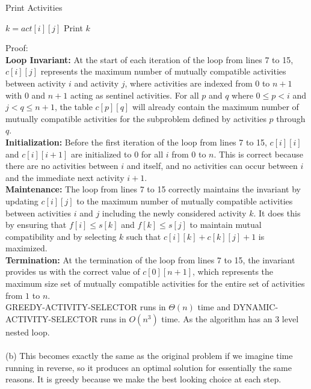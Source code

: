 \documentclass{article}
\begin{document}
\begin{algorithm}
\caption{Print Activities}
\begin{algorithmic}[1]
        \State $k = act[i][j]$
        \State Print $k$
        \State {}
        \State {}
    \EndIf
\EndFunction
\end{algorithmic}
\end{algorithm}
Proof:\\
\textbf{Loop Invariant:} At the start of each iteration of the loop from lines 7 to 15, $c[i][j]$ represents the maximum number of mutually compatible activities between activity $i$ and activity $j$, where activities are indexed from $0$ to $n+1$ with $0$ and $n+1$ acting as sentinel activities. For all $p$ and $q$ where $0 \leq p < i$ and $j < q \leq n+1$, the table $c[p][q]$ will already contain the maximum number of mutually compatible activities for the subproblem defined by activities $p$ through $q$.\\
\textbf{Initialization:} Before the first iteration of the loop from lines 7 to 15, $c[i][i]$ and $c[i][i+1]$ are initialized to $0$ for all $i$ from $0$ to $n$. This is correct because there are no activities between $i$ and itself, and no activities can occur between $i$ and the immediate next activity $i+1$.\\
\textbf{Maintenance:} The loop from lines 7 to 15 correctly maintains the invariant by updating $c[i][j]$ to the maximum number of mutually compatible activities between activities $i$ and $j$ including the newly considered activity $k$. It does this by ensuring that $f[i] \leq s[k]$ and $f[k] \leq s[j]$ to maintain mutual compatibility and by selecting $k$ such that $c[i][k] + c[k][j] + 1$ is maximized.\\
\textbf{Termination:} At the termination of the loop from lines 7 to 15, the invariant provides us with the correct value of $c[0][n+1]$, which represents the maximum size set of mutually compatible activities for the entire set of activities from $1$ to $n$.\\
GREEDY-ACTIVITY-SELECTOR runs in $\Theta(n)$ time and
DYNAMIC-ACTIVITY-SELECTOR runs in $O(n^3)$ time. As the algorithm has an 3 level nested loop.\\\\
(b)
This becomes exactly the same as the original problem if we imagine time running in reverse, so it produces an optimal solution for essentially the same reasons. It is greedy because we make the best looking choice at each step.\\\\
\end{document}
